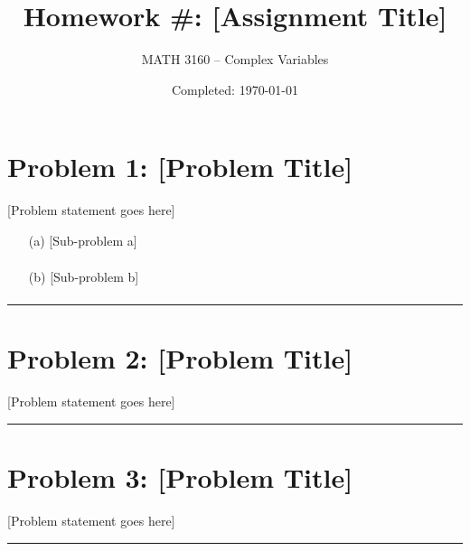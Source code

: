 \documentclass{article}
\title{Homework \#: [Assignment Title]}
\author{
  MATH 3160 -- Complex Variables\\
  \myauthor
}
\date{Completed: \today}
\begin{document}
\maketitle %


\section*{Problem 1: [Problem Title]}
[Problem statement goes here]

\begin{enumerate}
\item[(a)] [Sub-problem a]
  \begin{align*}
  \end{align*}
  
\item[(b)] [Sub-problem b]
  \begin{align*}
  \end{align*}
\end{enumerate}

\vspace{.5cm} %

\hrule %

\newpage
\section*{Problem 2: [Problem Title]}
[Problem statement goes here]

\begin{center}
\end{center}

\vspace{.5cm} %

\hrule

\newpage
\section*{Problem 3: [Problem Title]}
[Problem statement goes here]

\vspace{.5cm} %

\hrule

\end{document}

